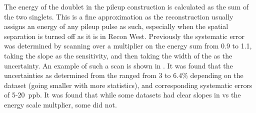 The energy of the doublet in the pileup construction is calculated as the sum of the two singlets. This is a fine approximation as the reconstruction usually assigns an energy of any pileup pulse as such, especially when the spatial separation is turned off as it is in Recon West. Previously the systematic error was determined by scanning over a multiplier on the energy sum from 0.9 to 1.1, taking the slope as the sensitivity, and then taking the width of the \chisq as the uncertainty. An example of such a scan is shown in . It was found that the uncertainties as determined from the \chisq ranged from 3 to 6.4\% depending on the dataset (going smaller with more statistics), and corresponding systematic errors of 5-20~ppb. It was found that while some datasets had clear slopes in \R vs the energy scale multplier, some did not.



